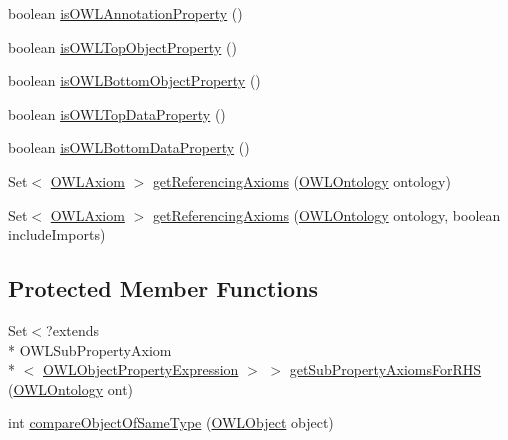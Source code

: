 \begin{DoxyCompactItemize}
\item 
boolean \hyperlink{classuk_1_1ac_1_1manchester_1_1cs_1_1owl_1_1owlapi_1_1_o_w_l_object_property_impl_a8878d6a5d8151e500c9a276a346cc0e8}{is\-O\-W\-L\-Annotation\-Property} ()
\item 
boolean \hyperlink{classuk_1_1ac_1_1manchester_1_1cs_1_1owl_1_1owlapi_1_1_o_w_l_object_property_impl_a40ab71f6107e32ecbc9d544a4fa7f660}{is\-O\-W\-L\-Top\-Object\-Property} ()
\item 
boolean \hyperlink{classuk_1_1ac_1_1manchester_1_1cs_1_1owl_1_1owlapi_1_1_o_w_l_object_property_impl_ac72499254a831ea0d75336adc8d4118d}{is\-O\-W\-L\-Bottom\-Object\-Property} ()
\item 
boolean \hyperlink{classuk_1_1ac_1_1manchester_1_1cs_1_1owl_1_1owlapi_1_1_o_w_l_object_property_impl_aae342cc18333b0f81ac58e06b6082fba}{is\-O\-W\-L\-Top\-Data\-Property} ()
\item 
boolean \hyperlink{classuk_1_1ac_1_1manchester_1_1cs_1_1owl_1_1owlapi_1_1_o_w_l_object_property_impl_aae3e76e0b5d686d7b51f30ce02f996c6}{is\-O\-W\-L\-Bottom\-Data\-Property} ()
\item 
Set$<$ \hyperlink{interfaceorg_1_1semanticweb_1_1owlapi_1_1model_1_1_o_w_l_axiom}{O\-W\-L\-Axiom} $>$ \hyperlink{classuk_1_1ac_1_1manchester_1_1cs_1_1owl_1_1owlapi_1_1_o_w_l_object_property_impl_a4f682a675a393782567b565448127659}{get\-Referencing\-Axioms} (\hyperlink{interfaceorg_1_1semanticweb_1_1owlapi_1_1model_1_1_o_w_l_ontology}{O\-W\-L\-Ontology} ontology)
\item 
Set$<$ \hyperlink{interfaceorg_1_1semanticweb_1_1owlapi_1_1model_1_1_o_w_l_axiom}{O\-W\-L\-Axiom} $>$ \hyperlink{classuk_1_1ac_1_1manchester_1_1cs_1_1owl_1_1owlapi_1_1_o_w_l_object_property_impl_a1f6f8af3b0ff3a21b4866924c3a2af75}{get\-Referencing\-Axioms} (\hyperlink{interfaceorg_1_1semanticweb_1_1owlapi_1_1model_1_1_o_w_l_ontology}{O\-W\-L\-Ontology} ontology, boolean include\-Imports)
\end{DoxyCompactItemize}
\subsection*{Protected Member Functions}
\begin{DoxyCompactItemize}
\item 
Set$<$?extends \\*
O\-W\-L\-Sub\-Property\-Axiom\\*
$<$ \hyperlink{interfaceorg_1_1semanticweb_1_1owlapi_1_1model_1_1_o_w_l_object_property_expression}{O\-W\-L\-Object\-Property\-Expression} $>$ $>$ \hyperlink{classuk_1_1ac_1_1manchester_1_1cs_1_1owl_1_1owlapi_1_1_o_w_l_object_property_impl_a0613befe59bc15e4031126854cdafb5f}{get\-Sub\-Property\-Axioms\-For\-R\-H\-S} (\hyperlink{interfaceorg_1_1semanticweb_1_1owlapi_1_1model_1_1_o_w_l_ontology}{O\-W\-L\-Ontology} ont)
\item 
int \hyperlink{classuk_1_1ac_1_1manchester_1_1cs_1_1owl_1_1owlapi_1_1_o_w_l_object_property_impl_a08ba6b1863b68e383872d7ffc5070868}{compare\-Object\-Of\-Same\-Type} (\hyperlink{interfaceorg_1_1semanticweb_1_1owlapi_1_1model_1_1_o_w_l_object}{O\-W\-L\-Object} object)
\end{DoxyCompactItemize}
